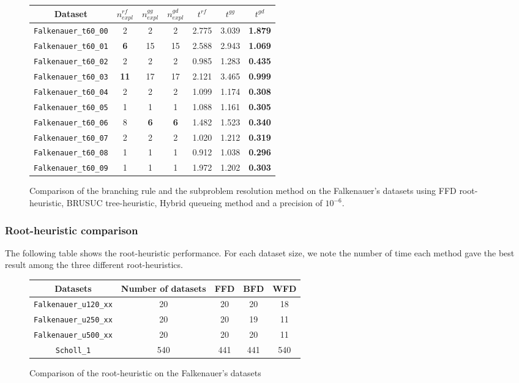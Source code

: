 \begin{figure}[!ht]
	\centering
	\small{
	\begin{tabular}{|ccccccc|}
		\hline
		\rowcolor{gray!50}
		Dataset & $n_{expl}^{rf}$ & $n_{expl}^{gg}$ & $n_{expl}^{gd}$ & $t^{rf}$ & $t^{gg}$ & $t^{gd}$ \\
		\hline
		\texttt{Falkenauer\_t60\_00} & 2 & 2 & 2 & 2.775 & 3.039 & \textbf{1.879} \\
		\texttt{Falkenauer\_t60\_01} & \textbf{6} & 15 & 15 & 2.588 & 2.943 & \textbf{1.069} \\
		\texttt{Falkenauer\_t60\_02} & 2 & 2 & 2 & 0.985 & 1.283 & \textbf{0.435} \\
		\texttt{Falkenauer\_t60\_03} & \textbf{11} & 17 & 17 & 2.121 & 3.465 & \textbf{0.999} \\
		\texttt{Falkenauer\_t60\_04} & 2 & 2 & 2 & 1.099 & 1.174 & \textbf{0.308} \\
		\texttt{Falkenauer\_t60\_05} & 1 & 1 & 1 & 1.088 & 1.161 & \textbf{0.305} \\
		\texttt{Falkenauer\_t60\_06} & 8 & \textbf{6} & \textbf{6} & 1.482 & 1.523 & \textbf{0.340} \\
		\texttt{Falkenauer\_t60\_07} & 2 & 2 & 2 & 1.020 & 1.212 & \textbf{0.319} \\
		\texttt{Falkenauer\_t60\_08} & 1 & 1 & 1 & 0.912 & 1.038 & \textbf{0.296} \\
		\texttt{Falkenauer\_t60\_09} & 1 & 1 & 1 & 1.972 & 1.202 & \textbf{0.303} \\
		\hline  
	\end{tabular}
	\caption{Comparison of the branching rule and the subproblem resolution method on the Falkenauer's datasets using FFD root-heuristic, BRUSUC tree-heuristic, Hybrid queueing method and a precision of $10^{-6}$.}
	}
\end{figure}

\subsubsection{Root-heuristic comparison}

The following table shows the root-heuristic performance. For each dataset size, we note the number of time each method gave the best result among the three different root-heuristics.

\begin{figure}[!ht]
	\centering
	\small{
		\begin{tabular}{|ccccc|}
			\hline
			\rowcolor{gray!50}
			Datasets & Number of datasets & FFD & BFD & WFD  \\
			\hline
			\texttt{Falkenauer\_u120\_xx} & 20 & 20 & 20 & 18 \\
			\texttt{Falkenauer\_u250\_xx} & 20 & 20 & 19 & 11 \\
			\texttt{Falkenauer\_u500\_xx} & 20 & 20 & 20 & 11 \\
			\texttt{Scholl\_1} & 540 & 441 & 441 & 540  \\
			\hline  
		\end{tabular}
		\caption{Comparison of the root-heuristic on the Falkenauer's datasets}
	}
\end{figure}

